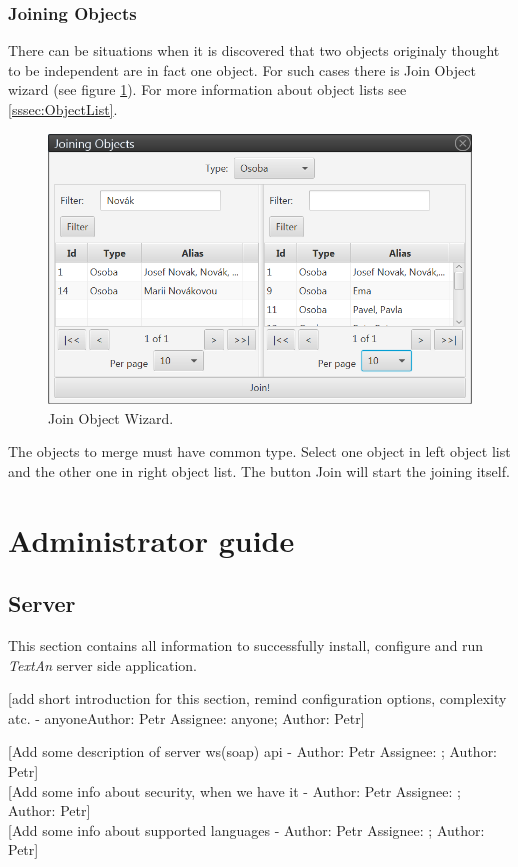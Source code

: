 \documentclass[12pt,a4paper]{report}
\makeatletter
\newcommand{\comment}[3][\@empty]{
  {\color{magenta}[#3 - }
  {\color{green}\ifx\@empty#1\relax Author: #2 \else Assignee: #1; Author: #2\fi}{\color{magenta}]}
}
\newcommand{\textan}{\emph{TextAn}}
\makeatother
\begin{document}
\subsection{Joining Objects}
\label{ssec:JoinObjects}

There can be situations when it is discovered that two objects originaly
thought to be independent are in fact one object. For such cases there is Join
Object wizard (see figure \ref{fig:Join}). For more information about object
lists see \ref{sssec:ObjectList}.

\begin{figure}[!htb]
        \centering
        \includegraphics[width=\textwidth]{Images/join}
        \caption{Join Object Wizard.}
        \label{fig:Join}
\end{figure}

The objects to merge must have common type. Select one object in left object
list and the other one in right object list. The button Join will start the
joining itself.

\chapter{Administrator guide}

\section{Server}
This section contains all information to successfully install, configure and run
\textan{} server side application.
\comment[anyone]{Petr}{add short introduction for this section, remind configuration
options, complexity atc.}

\comment{Petr}{Add some description of server ws(soap) api}\\
\comment{Petr}{Add some info about security, when we have it}\\
\comment{Petr}{Add some info about supported languages}
\end{document}
